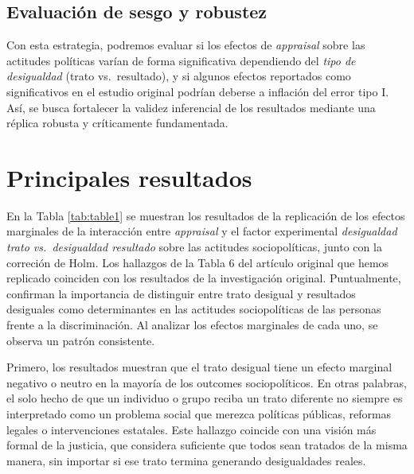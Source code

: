 \documentclass[
  13pt,
  a4paper,
]{article}
\begin{document}
\hypertarget{evaluaciuxf3n-de-sesgo-y-robustez}{%
\subsection{Evaluación de sesgo y robustez}\label{evaluaciuxf3n-de-sesgo-y-robustez}}

Con esta estrategia, podremos evaluar si los efectos de \emph{appraisal} sobre las actitudes políticas varían de forma significativa dependiendo del \emph{tipo de desigualdad} (trato vs.~resultado), y si algunos efectos reportados como significativos en el estudio original podrían deberse a inflación del error tipo I. Así, se busca fortalecer la validez inferencial de los resultados mediante una réplica robusta y críticamente fundamentada.

\hypertarget{principales-resultados}{%
\section{Principales resultados}\label{principales-resultados}}

En la Tabla \ref{tab:table1} se muestran los resultados de la replicación de los efectos marginales de la interacción entre \emph{appraisal} y el factor experimental \emph{desigualdad trato vs.~desigualdad resultado} sobre las actitudes sociopolíticas, junto con la correción de Holm. Los hallazgos de la Tabla 6 del artículo original que hemos replicado coinciden con los resultados de la investigación original. Puntualmente, confirman la importancia de distinguir entre trato desigual y resultados desiguales como determinantes en las actitudes sociopolíticas de las personas frente a la discriminación. Al analizar los efectos marginales de cada uno, se observa un patrón consistente.

Primero, los resultados muestran que el trato desigual tiene un efecto marginal negativo o neutro en la mayoría de los outcomes sociopolíticos. En otras palabras, el solo hecho de que un individuo o grupo reciba un trato diferente no siempre es interpretado como un problema social que merezca políticas públicas, reformas legales o intervenciones estatales. Este hallazgo coincide con una visión más formal de la justicia, que considera suficiente que todos sean tratados de la misma manera, sin importar si ese trato termina generando desigualdades reales.
\end{document}
